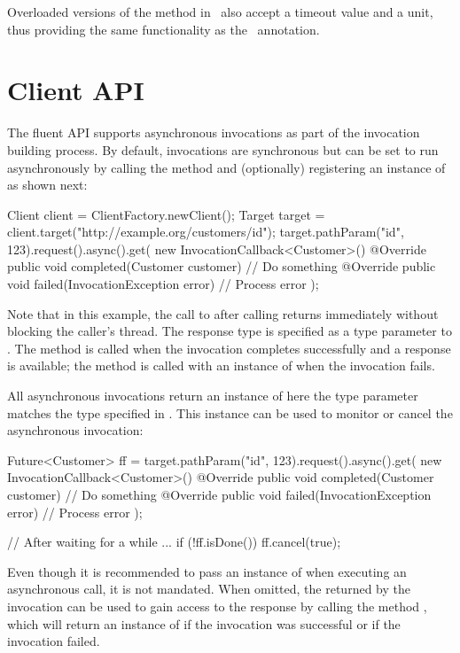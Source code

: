 Overloaded versions of the method  in \ExecutionContext\ also accept a timeout value and a unit, thus providing the same functionality as the \Suspend\ annotation. 

\section{Client API}
\label{client_api_async}

The fluent API supports asynchronous invocations as part of the invocation building process. By default, invocations are synchronous but can be set to run asynchronously by calling the  method and (optionally) registering an instance of  as shown next:

\begin{listing}{1}
Client client = ClientFactory.newClient();
Target target = client.target("http://example.org/customers/{id}");
target.pathParam("id", 123).request().async().get(
    new InvocationCallback<Customer>() {
        @Override
        public void completed(Customer customer) {
            // Do something
        }
        @Override
        public void failed(InvocationException error) {
            // Process error
        }
    });
\end{listing}

Note that in this example, the call to  after calling  returns immediately without blocking the caller's thread.
The response type is specified as a type parameter to . The method  is called when the invocation completes successfully and a response is available; the method  is called with an instance of  when the invocation fails.

All asynchronous invocations return an instance of  here the type parameter  matches the type specified in . This instance can be used to monitor or cancel the asynchronous invocation:

\begin{listing}{1}
Future<Customer> ff = target.pathParam("id", 123).request().async().get(
    new InvocationCallback<Customer>() {
        @Override
        public void completed(Customer customer) {
            // Do something
        }
        @Override
        public void failed(InvocationException error) {
            // Process error
        }
    });

// After waiting for a while ...
if (!ff.isDone()) {
    ff.cancel(true);
} 
\end{listing}

Even though it is recommended to pass an instance of  when executing an asynchronous call, it is not mandated. When omitted, the  returned by the invocation can be used to gain access to the response by calling the method , which will return an instance of  if the invocation was successful or  if the invocation failed.






